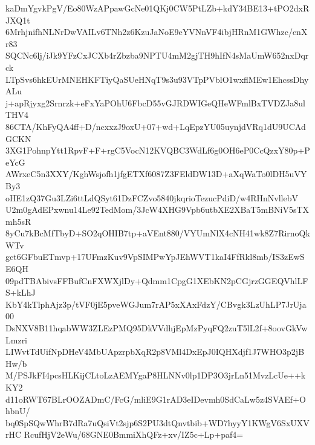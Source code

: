 kaDmYgvkPgV/Eo80WzAPpawGcNe01QKj0CW5PtLZb+kdY34BE13+tPO2dxRJXQ1t
6MrhjnifhNLNrDwVAILv6TNh2z6KzuJaNoE9eYVNnVF4ibjHRnM1GWhzc/enXr83
SQCNc6lj/iJk9YFzCxJCXb4rZbzba9NPTU4mM2gjTH9hIfN4sMaUmW652nxDqrck
LTpSvs6hkEUrMNEHKFTiyQaSUeHNqT9s3u93VTpPVblO1wxflMEw1EhcssDhyALu
j+apRjyxg2Srnrzk+eFxYaPOhU6FbcD55vGJRDWIGeQHeWFmlBxTVDZJa8ulTHV4
86CTA/KhFyQA4ff+D/ncxxzJ9oxU+07+wd+LqEpzYU05uynjdVRq1dU9UCAdGCKN
3XG1PohnpYtt1RpvF+F+rgC5VocN12KVQBC3WdLf6g0OH6eP0CcQzxY80p+PeYcG
AWrxeC5n3XXY/KghWsjofh1jfgETXf6087Z3FEldDW13D+aXqWaTo0lDH5uVYBy3
oHE1zQ37Gu3LZi6ttLdQSyt61DzFCZvo5840jkqrioTezucPdiD/w4RHnNvllebV
U2m0gAdEPxwnu14Le92TedMom/3JcW4XHG9Vpb6utbXE2XBaT5mBNiV5sTXmh5sR
8yCu7kBcMfTbyD+SO2qOHIB7tp+aVEnt880/VYUmNlX4cNH41wk8Z7RirnoQkWTv
gct6GFbuETmvp+17UFmzKuv9VpSIMPwYpJEhWVT1kaI4FfRkl8mb/IS3zEwSE6QH
09pdTBAbivsFFBufCnFXWXjlDy+Qdmm1CpgG1XEbKN2pCGjrzGGEQVhlLFS+kLhJ
KbY4kTlphAjz3p/tVF0jE5pveWGJum7rAP5xXAxFdzY/CBvgk3LzUhLP7JrUja00
DsNXV8B11hqabWW3ZLEzPMQ95DkVVdhjEpMzPyqFQ2zuT5lL2f+8oovGkVwLmzri
LIWvtTdUifNpDHeV4MbUApzrpbXqR2p8VMl4DxEpJ0IQHXdjf1J7WHO3p2jBHw/b
M/PSJkFI4pcsHLKijCLtoLzAEMYgaP8HLNNv0lp1DP3O3jrLn51MvzLcUe++kKY2
d11oRWT67BLrOOZADmC/FcG/mliE9G1rAD3eIDevmh0SdCaLw5z4SVAEf+OhbnU/
bq0SpSQwWhrB7dRa7uQsiVt2sjp6S2PU3dtQnvtbib+WD7hyyY1KWgV6SxUXVrHC
RcufHjV2eWu/68GNE0BmmiXhQFz+xv/IZ5c+Lp+paf4=
